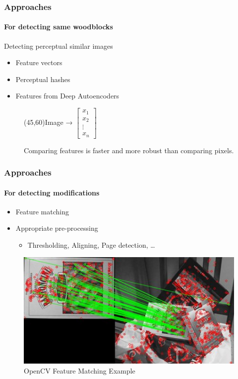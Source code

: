 \documentclass{beamer}
\begin{document}
  \begin{frame}
    \frametitle{Approaches}
    \framesubtitle{For detecting same woodblocks}
    Detecting perceptual similar images
    \begin{itemize}
    \item Feature vectors
    \item Perceptual hashes
    \item Features from Deep Autoencoders
    \end{itemize}
    \begin{figure}
      \centering
      \framebox(45,60){Image}
      \Huge→
      \normalsize $\begin{bmatrix} x_1 \\ x_2 \\ \vdots \\ x_n \end{bmatrix}$

      \vspace{1em}Comparing features is faster and more robust than comparing pixels.
    \end{figure}
  \end{frame}
  
  \begin{frame}
    \frametitle{Approaches}
    \framesubtitle{For detecting modifications}
    \begin{itemize}
    \item Feature matching
    \item Appropriate pre-processing
      \begin{itemize}
      \item Thresholding, Aligning, Page detection, …
      \end{itemize}
    \end{itemize}
    \begin{figure}
      \includegraphics[width=.6\linewidth]{matcher_flann}
      \caption{OpenCV Feature Matching Example}
    \end{figure}
  \end{frame}
\end{document}
